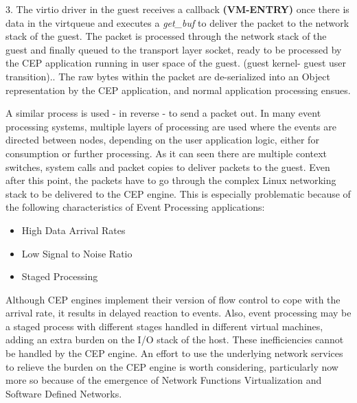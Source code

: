 3. The virtio driver in the guest receives a callback \textbf{(VM-ENTRY)} once there is data in the virtqueue and executes a \textit{get_buf}  to deliver the packet to the network stack of the guest. The packet is processed through the network stack of the guest and finally queued to the transport layer socket, ready to be processed by the CEP application running in user space of the guest.  (guest kernel- guest user transition).\newline {}. The raw bytes within the packet are de-serialized into an Object representation by the CEP application, and normal application processing ensues.\newline  
 

A similar process is used - in reverse - to send a packet out. In many event processing systems, multiple layers of processing are used where the events are directed between nodes, depending on the user application logic, either for consumption or further processing. As it can seen there are multiple context switches, system calls and packet copies to deliver packets to the guest. Even after this point, the packets have to go through the complex Linux networking stack \cite{beifuss2015study} to be delivered to the CEP engine.  This is especially problematic because of the following characteristics of Event Processing applications:
\begin{itemize}
 \item High Data Arrival Rates
 \item Low Signal to Noise Ratio
 \item Staged Processing
\end{itemize}

 Although CEP engines implement their version of flow control to cope with the arrival rate, it results in delayed reaction to events. Also, event processing may be a staged process with different stages handled in different virtual machines, adding an extra burden on the I/O stack of the host. These inefficiencies cannot be handled by the CEP engine. An effort to use the underlying network services to relieve the burden on the CEP engine is worth considering, particularly now more so because of the emergence of Network Functions Virtualization and Software Defined Networks. 

